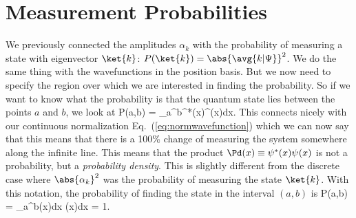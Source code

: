 \section{Measurement Probabilities}

We previously connected the amplitudes $\alpha_k$ with the probability of measuring a state with eigenvector $\ket{k}$: $P(\ket{k}) = \abs{\avg{k|\Psi}}^2$.\marginnote{\ref{tool:prob}} We do the same thing with the wavefunctions in the position basis. But we now need to specify the region over which we are interested in finding the probability. So if we want to know what the probability is that the quantum state lies between the points $a$ and $b$, we look at
\beq
P(a,b) = \int\displaylimits_a^b\psi^{*}(x)\psi^{}(x)dx.
\eeq{}%
This connects nicely with our continuous normalization Eq.~(\ref{eq:normwavefunction}) which we can now say that this means that there is a 100\% change of measuring the system somewhere along the infinite line.  This means that the product $\Pd(x) \equiv \psi^{*}(x)\psi^{}(x)$ is not a probability, but a {\em probability density}. This is slightly different from the discrete case where $\abs{\alpha_k}^2$ was the probability of measuring the state $\ket{k}$. With this notation, the probability of finding the state in the interval $(a,b)$ is
\beq
P(a,b) = \int\displaylimits_a^b\Pd(x)dx  \intii \Pd(x)dx = 1.
\eeq

